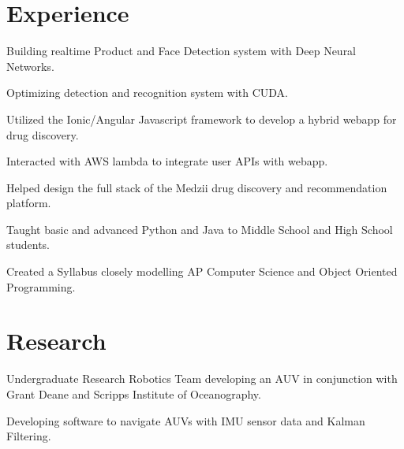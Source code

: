 \documentclass[]{deedy-resume-openfont}
\begin{document}
\begin{minipage}[t]{0.66\textwidth} 


\section{Experience}

\vspace{\topsep} %
\begin{tightemize}
\item Building realtime Product and Face Detection system with Deep Neural Networks.
\item Optimizing detection and recognition system with CUDA.
\end{tightemize}
\sectionsep

\begin{tightemize}
\item Utilized the Ionic/Angular Javascript framework to develop a hybrid webapp for drug discovery.
\item Interacted with AWS lambda to integrate user APIs with webapp.
\item Helped design the full stack of the Medzii drug discovery and recommendation platform.
\end{tightemize}
\sectionsep

\begin{tightemize}
\item Taught basic and advanced Python and Java to Middle School and High School students.
\item Created a Syllabus closely modelling AP Computer Science and Object Oriented Programming.
\end{tightemize}
\sectionsep

\vspace{3mm}

\section{Research}
\begin{tightemize}
\item Undergraduate Research Robotics Team developing an AUV in conjunction with Grant Deane and Scripps Institute of Oceanography.
\item Developing software to navigate AUVs with IMU sensor data and Kalman Filtering.
\end{tightemize}
\sectionsep


\end{minipage}
\end{document}
